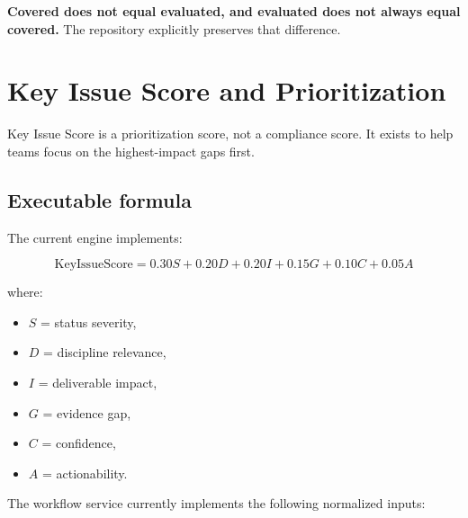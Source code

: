 \documentclass[10pt,letterpaper]{article}
\newcommand{\strong}[1]{\textbf{\textcolor{emaNavy}{#1}}}
\newcommand{\keyconcept}[1]{%
\begin{tcolorbox}[colback=emaSoft,borderline west={3pt}{0pt}{emaBlue}]
\small #1
\end{tcolorbox}}
\begin{document}
\keyconcept{\strong{Covered does not equal evaluated, and evaluated does not always equal covered.} The repository explicitly preserves that difference.}

\section{Key Issue Score and Prioritization}

Key Issue Score is a prioritization score, not a compliance score. It exists to help teams focus on the highest-impact gaps first.

\subsection{Executable formula}

The current engine implements:

\[
\text{KeyIssueScore} = 0.30S + 0.20D + 0.20I + 0.15G + 0.10C + 0.05A
\]

where:

\begin{itemize}
  \item $S$ = status severity,
  \item $D$ = discipline relevance,
  \item $I$ = deliverable impact,
  \item $G$ = evidence gap,
  \item $C$ = confidence,
  \item $A$ = actionability.
\end{itemize}

The workflow service currently implements the following normalized inputs:
\end{document}
